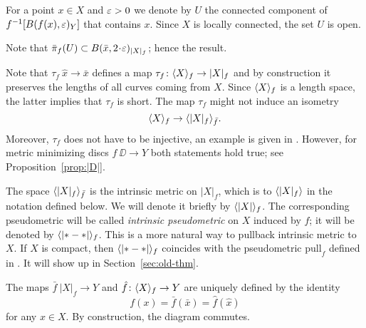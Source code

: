 \documentclass{article}
\begin{document}
For a point $x\in X$ and $\varepsilon>0$ we denote by $U$ the connected component of $f^{-1}[B(f(x),\varepsilon)_{Y}]$ that contains $x$.
Since $X$ is locally connected, the set $U$ is open.

Note that $\bar\pi_f(U)\subset B(\bar x,2\cdot \eps)_{|X|_f}$;
hence the result.
\qeds



\begin{wrapfigure}{R}{37 mm}
\label{diagram-page}
\end{wrapfigure}

Note that $\tau_f\: \hat x\to \bar x$ defines a map $\tau_f\: \<X\>_f\zz\to |X|_f$ and by construction it preserves the lengths of
all curves coming from $X$.
Since $\langle X\rangle_f$ is a length space, the latter implies that $\tau_f$ is short.
The map $\tau_f$ might not induce an isometry
\[\langle X\rangle_f\to\langle|X|_f\rangle_{\bar f}.\]
Moreover, $\tau_f$ does not have to be injective, an example is given in \cite[4.2]{petrunin-intrinisic}.
However, for metric minimizing discs $f\:\DD\to Y$ both statements hold true; see
Proposition~\ref{prop:|D|}.

The space $\langle|X|_f\rangle_{\bar f}$ is the intrinsic metric on $|X|_f$, which is to $\langle|X|_f\rangle$ in the notation defined below.
We will denote it briefly by $\langle|X|\rangle_f$.
The corresponding pseudometric will be called \emph{intrinsic pseudometric} on $X$ induced by $f$; it will be denoted by $\langle|{*}-{*}|\rangle_f$.
This is a more natural way to pullback intrinsic metric to $X$.
If $X$ is compact, then $\langle|{*}-{*}|\rangle_f$ coincides with the pseudometric $\mathrm{pull}_f$ defined in \cite{petrunin-intrinisic}.
It will show up in Section~\ref{sec:old-thm}.

The maps $\bar f\:|X|_f\to Y$ and $ \hat f\colon\langle X\rangle_f\to Y$ are uniquely defined by the identity
\[f(x)=\bar f(\bar x)=  \hat f( \hat x)\] for any $x\in X$.
By construction, the diagram commutes.
\end{document}
